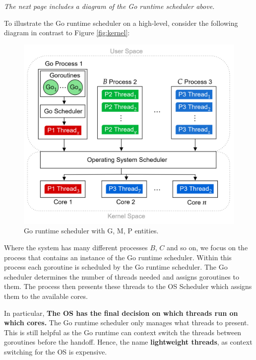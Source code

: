 \vfill
\begin{center}
    
    \textit{The next page includes a diagram of the Go runtime scheduler above.}
\end{center}

\vfill
\newpage
\noindent
To illustrate the Go runtime scheduler on a high-level, consider the following diagram in contrast to Figure \ref{fig:kernel}: 

\begin{figure}[h]
    
    \includegraphics[width=1\textwidth]{Sections/rpc/high_sched.png}
    \caption{Go runtime scheduler with G, M, P entities.}
    \label{fig:go_scheduler}
\end{figure}
\noindent
Where the system has many different processes $B$, $C$ and so on, we focus on the process that contains an instance of the Go runtime scheduler.
Within this process each goroutine is scheduled by the Go runtime scheduler. The Go scheduler determines the number of threads needed
and assigns goroutines to them. The process then presents these threads to the OS Scheduler which assigns them to the available cores.

In particular, \textbf{The OS has the final decision on which threads run on which cores.} The Go runtime scheduler only manages what threads to present.
This is still helpful as the Go runtime can context switch the threads between goroutines before the handoff. Hence, the name \textbf{lightweight threads}, as 
context switching for the OS is expensive.

